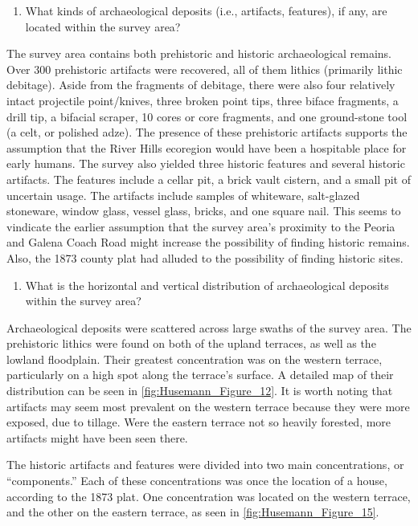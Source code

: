 \begin{enumerate}[resume]
	\item What kinds of archaeological deposits (i.e., artifacts, features), if any, are located within the survey area?
\end{enumerate}

The survey area contains both prehistoric and historic archaeological remains. Over 300 prehistoric artifacts were recovered, all of them lithics (primarily lithic debitage). Aside from the fragments of debitage, there were also four relatively intact projectile point/knives, three broken point tips, three biface fragments, a drill tip, a bifacial scraper, 10 cores or core fragments, and one ground-stone tool (a celt, or polished adze). The presence of these prehistoric artifacts supports the assumption that the River Hills ecoregion would have been a hospitable place for early humans.
The survey also yielded three historic features and several historic artifacts. The features include a cellar pit, a brick vault cistern, and a small pit of uncertain usage. The artifacts include samples of whiteware, salt-glazed stoneware, window glass, vessel glass, bricks, and one square nail. This seems to vindicate the earlier assumption that the survey area’s proximity to the Peoria and Galena Coach Road might increase the possibility of finding historic remains. Also, the 1873 county plat had alluded to the possibility of finding historic sites.

\begin{enumerate}[resume]
	\item What is the horizontal and vertical distribution of archaeological deposits within the survey area?
\end{enumerate}

Archaeological deposits were scattered across large swaths of the survey area. The prehistoric lithics were found on both of the upland terraces, as well as the lowland floodplain. Their greatest concentration was on the western terrace, particularly on a high spot along the terrace’s surface. A detailed map of their distribution can be seen in \cref{fig:Husemann_Figure_12}. It is worth noting that artifacts may seem most prevalent on the western terrace because they were more exposed, due to tillage. Were the eastern terrace not so heavily forested, more artifacts might have been seen there.

The historic artifacts and features were divided into two main concentrations, or “components.” Each of these concentrations was once the location of a house, according to the 1873 plat. One concentration was located on the western terrace, and the other on the eastern terrace, as seen in \cref{fig:Husemann_Figure_15}.

